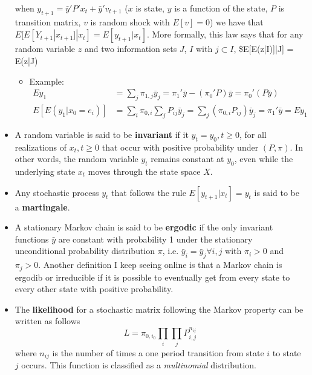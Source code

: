\documentclass[11pt]{article}
\begin{document}
\begin{itemize}
  when $y_{t+1} = \bar{y}' P' x_t + \bar{y}'v_{t+1}$ ($x$ is state,
  $y$ is a function of the state, $P$ is transition matrix, $v$ is
  random shock with $E[v] = 0$) we have that
  $E[E[Y_{t+1}|x_{t+1}]|x_t] = E[y_{t+1}|x_t]$. More formally, this
  law says that for any random variable $z$ and two information sets
  $J$, $I$ with $j \subset I$, \$E[E(z|I)]|J] = E(z|J)
\begin{itemize}
\item Example: $$
    \begin{align}
    E y_1 &= \sum_j \pi_{1, j} \bar{y}_j = \pi_1' \bar{y} - (\pi_0'P)\bar{y} = \pi_0' (P \bar{y}) \\
    E[E(y_1|x_0 = e_i)] &= \sum_i \pi_{0, i} \sum_j P_{ij}\bar{y}_j = \sum_j \left(\pi_{0, i} P_{ij} \right)\bar{y}_j = \pi_1' \bar{y} = E y_1
    \end{align}
    $$
\end{itemize}
\item A random variable is said to be \textbf{invariant} if it $y_t = y_0, t \ge
  0$, for all realizations of $x_t, t \ge 0$ that occur with positive
  probability under $(P, \pi)$. In other words, the random variable
  $y_t$ remains constant at $y_0$, even while the underlying state
  $x_t$ moves through the state space $X$.
\item Any stochastic process $y_t$ that follows the rule $E[y_{t+1}|x_t] =
  y_t$ is said to be a \textbf{martingale}.
\item A stationary Markov chain is said to be \textbf{ergodic} if the only
  invariant functions $\bar{y}$ are constant with probability 1 under
  the stationary unconditional probability distribution $\pi$,
  i.e. $\bar{y}_i = \bar{y}_j \forall i, j$ with $\pi_i >0$ and $\pi_j
  >0$. Another definition I keep seeing online is that a Markov chain
  is ergodib or irreducible if it is possible to eventually get from
  every state to every other state with positive probability.
\item The \textbf{likelihood} for a stochastic matrix following the Markov
  property can be written as follows $$L = \pi_{0, i_0} \prod_i
  \prod_j P_{i, j}^{n_{ij}}$$ where $n_{ij}$ is the number of times a
  one period transition from state $i$ to state $j$ occurs. This
  function is classified as a \emph{multinomial} distribution.
\end{itemize}
\end{document}
